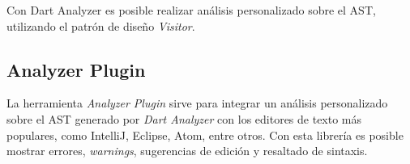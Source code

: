 	Con Dart Analyzer es posible realizar análisis personalizado sobre el AST, utilizando el patrón de diseño \textit{Visitor}.

	\subsection{Analyzer Plugin}

	La herramienta \textit{Analyzer Plugin} sirve para integrar un análisis personalizado sobre el AST generado por \textit{Dart Analyzer} con los editores de texto más populares, como IntelliJ, Eclipse, Atom, entre otros. Con esta librería es posible mostrar errores, \textit{warnings}, sugerencias de edición y resaltado de sintaxis. %
